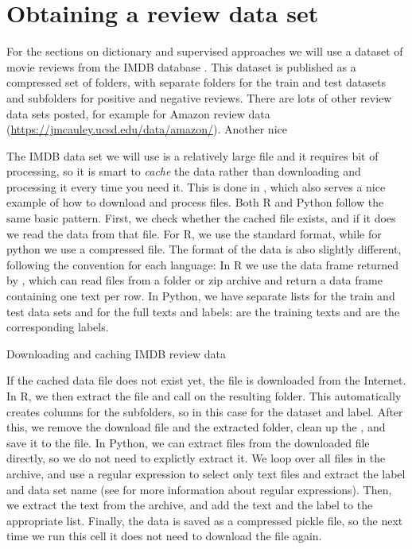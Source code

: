 \section{Obtaining a review data set}

For the sections on dictionary and supervised approaches we will use a dataset of movie reviews
from the IMDB database \citet{aclimdb}.
This dataset is published as a compressed set of folders, with separate folders for the train and test datasets and subfolders for positive and negative reviews.
There are lots of other review data sets posted, for example for Amazon review data (\url{https://jmcauley.ucsd.edu/data/amazon/}). Another nice 

The IMDB data set we will use is a relatively large file and it requires bit of processing,
so it is smart to \emph{cache} the data rather than downloading and processing it every time you need it.
This is done in , which also serves a nice example of how to download and process files.
Both R and Python follow the same basic pattern.
First, we check whether the cached file exists, and if it does we read the data from that file.
For R, we use the standard  format, while for python we use a compressed  file.
The format of the data is also slightly different, following the convention for each language:
In R we use the data frame returned by ,
which can read files from a folder or zip archive and return a data frame containing one text per row.
In Python, we have separate lists for the train and test data sets and for the full texts and labels:
 are the training texts and  are the corresponding labels.

\begin{ccsexample}
  \caption{Downloading and caching IMDB review data}\label{ex:reviewdata}
\end{ccsexample}

If the cached data file does not exist yet,
the file is downloaded from the Internet.
In R, we then extract the file and call  on the resulting folder.
This automatically creates columns for the subfolders, so in this case for the dataset and label.
After this, we remove the download file and the extracted folder,
clean up the , and save it to the  file.
In Python, we can extract files from the downloaded file directly,
so we do not need to explictly extract it.
We loop over all files in the archive, and use a regular expression to
select only text files and extract the label and data set name
(see  for more information about regular expressions).
Then, we extract the text from the archive, and add the text and the label to the appropriate list.
Finally, the data is saved as a compressed pickle file,
so the next time we run this cell it does not need to download the file again. 

